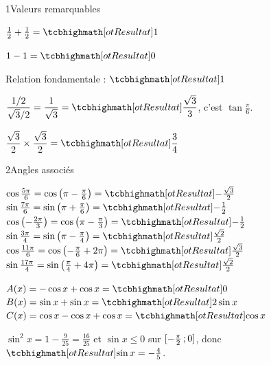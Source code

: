

\begin{deuxcolonnes}

\begin{corrige}{1}{Valeurs remarquables}
\begin{questions}
  \item $\frac12+\frac12=\res{1}$
  \item $1-1=\res{0}$
  \item Relation fondamentale : $\res{1}$
  \item $\dfrac{1/2}{\sqrt3/2}=\dfrac{1}{\sqrt3}=\res{\dfrac{\sqrt3}{3}}$, c'est $\tan\frac{\pi}{6}$.
  \item $\dfrac{\sqrt3}{2}\times\dfrac{\sqrt3}{2}=\res{\dfrac34}$
\end{questions}
\end{corrige}

\begin{corrige}{2}{Angles associés}
\begin{questions}
  \item $\cos\frac{5\pi}{6}=\cos\left(\pi-\frac{\pi}{6}\right)=\res{-\frac{\sqrt3}{2}}$\\[0.8mm]
    $\sin\frac{7\pi}{6}=\sin\left(\pi+\frac{\pi}{6}\right)=\res{-\frac12}$\\[0.8mm]
    $\cos\left(-\frac{2\pi}{3}\right)=\cos\left(\pi-\frac{\pi}{3}\right)=\res{-\frac12}$\\[0.8mm]
    $\sin\frac{3\pi}{4}=\sin\left(\pi-\frac{\pi}{4}\right)=\res{\frac{\sqrt2}{2}}$\\[0.8mm]
    $\cos\frac{11\pi}{6}=\cos\left(-\frac{\pi}{6}+2\pi\right)=\res{\frac{\sqrt3}{2}}$\\[0.8mm]
    $\sin\frac{17\pi}{4}=\sin\left(\frac{\pi}{4}+4\pi\right)=\res{\frac{\sqrt2}{2}}$
  \item $A(x)=-\cos x+\cos x=\res{0}$\\[0.8mm]
    $B(x)=\sin x+\sin x=\res{2\sin x}$\\[0.8mm]
    $C(x)=\cos x-\cos x+\cos x=\res{\cos x}$
  \item $\sin^{2}x=1-\frac{9}{25}=\frac{16}{25}$ et $\sin x\leq0$ sur $\mathopen{[}-\frac{\pi}{2}\,{;}\,0\mathclose{]}$, donc $\res{\sin x=-\frac45}$.
\end{questions}
\end{corrige}


\end{deuxcolonnes}
